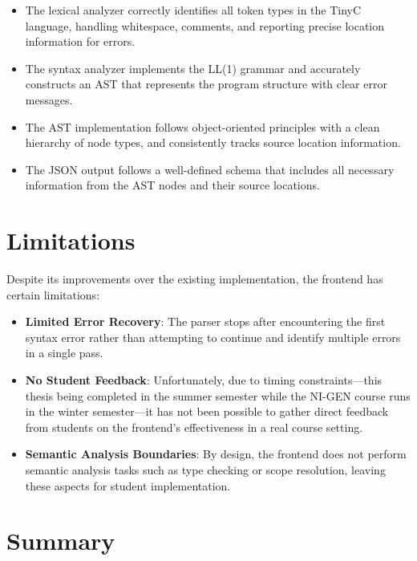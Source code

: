 \begin{itemize}
    \item The lexical analyzer correctly identifies all token types in the TinyC language, handling whitespace, comments, and reporting precise location information for errors.
    
    \item The syntax analyzer implements the LL(1) grammar and accurately constructs an AST that represents the program structure with clear error messages.
    
    \item The AST implementation follows object-oriented principles with a clean hierarchy of node types, and consistently tracks source location information.
    
    \item The JSON output follows a well-defined schema that includes all necessary information from the AST nodes and their source locations.
\end{itemize}

\section{Limitations}

Despite its improvements over the existing implementation, the frontend has certain limitations:

\begin{itemize}
    \item \textbf{Limited Error Recovery}: The parser stops after encountering the first syntax error rather than attempting to continue and identify multiple errors in a single pass.
    
    \item \textbf{No Student Feedback}: Unfortunately, due to timing constraints—this thesis being completed in the summer semester while the NI-GEN course runs in the winter semester—it has not been possible to gather direct feedback from students on the frontend's effectiveness in a real course setting.
    
    \item \textbf{Semantic Analysis Boundaries}: By design, the frontend does not perform semantic analysis tasks such as type checking or scope resolution, leaving these aspects for student implementation.
\end{itemize}


\section{Summary}

